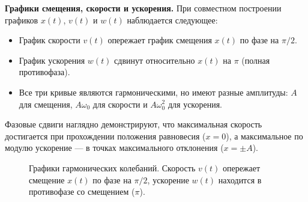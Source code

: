\begin{remark}
\textbf{Графики смещения, скорости и ускорения.} При совместном построении графиков $x(t)$, $v(t)$ и $w(t)$ наблюдается следующее:
\begin{itemize}
    \item График скорости $v(t)$ опережает график смещения $x(t)$ по фазе на $\pi/2$.
    \item График ускорения $w(t)$ сдвинут относительно $x(t)$ на $\pi$ (полная противофаза).
    \item Все три кривые являются гармоническими, но имеют разные амплитуды: $A$ для смещения, $A\omega_0$ для скорости и $A\omega_0^2$ для ускорения.
\end{itemize}
Фазовые сдвиги наглядно демонстрируют, что максимальная скорость достигается при прохождении положения равновесия ($x=0$), а максимальное по модулю ускорение --- в точках максимального отклонения ($x=\pm A$).
\end{remark}

\begin{figure}[htbp]
    \centering
    \caption{Графики гармонических колебаний. Скорость $v(t)$ опережает смещение $x(t)$ по фазе на $\pi/2$, ускорение $w(t)$ находится в противофазе со смещением ($\pi$).}
    \label{fig:harmonic_xyz_clean}
\end{figure}

